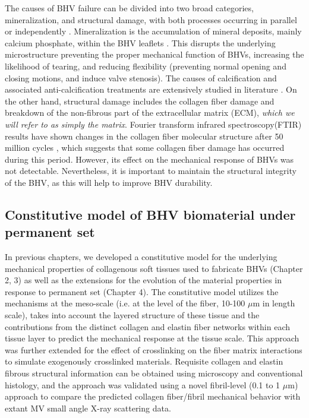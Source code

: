     The causes of BHV failure can be divided into two broad categories, mineralization, and structural damage, with both processes occurring in parallel or independently \cite{sacks_collagen_2002}. Mineralization is the accumulation of mineral deposits, mainly calcium phosphate, within the BHV leaflets \cite{schoen_calcification_2005}. This disrupts the underlying microstructure preventing the proper mechanical function of BHVs, increasing the likelihood of tearing, and reducing flexibility (preventing normal opening and closing motions, and induce valve stenosis). The causes of calcification and associated anti-calcification treatments are extensively studied in literature \cite{park_novel_1997, isenburg_tannic_2005, vyavahare_prevention_1997}. On the other hand, structural damage includes the collagen fiber damage and breakdown of the non-fibrous part of the extracellular matrix (ECM), \emph{which we will refer to as simply the matrix}. Fourier transform infrared spectroscopy(FTIR) results have shown changes in the collagen fiber molecular structure after 50 million cycles \cite{sun_response_2004}, which suggests that some collagen fiber damage has occurred during this period. However, its effect on the mechanical response of BHVs was not detectable. Nevertheless, it is important to maintain the structural integrity of the BHV, as this will help to improve BHV durability.
    

\subsection{Constitutive model of BHV biomaterial under permanent set}

    In previous chapters, we developed a constitutive model for the underlying mechanical properties of collagenous soft tissues used to fabricate BHVs (Chapter 2, 3) as well as the extensions for the evolution of the material properties in response to permanent set (Chapter 4). The constitutive model utilizes the mechanisms at the meso-scale (i.e. at the level of the fiber, 10-100 $\mu$m in length scale), takes into account the layered structure of these tissue and the contributions from the distinct collagen and elastin fiber networks within each tissue layer to predict the mechanical response at the tissue scale. This approach was further extended for the effect of crosslinking on the fiber matrix interactions to simulate exogenously crosslinked materials. Requisite collagen and elastin fibrous structural information can be obtained using microscopy and conventional histology, and the approach was validated using a novel fibril-level (0.1 to 1 $\mu$m) approach to compare the predicted collagen fiber/fibril mechanical behavior with extant MV small angle X-ray scattering data. 
    
